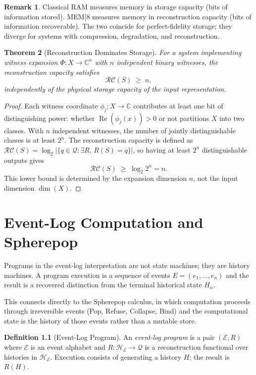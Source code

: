 \documentclass[12pt, oneside]{book}
\theoremstyle{plain}
\newtheorem{theorem}{Theorem}[chapter]
\theoremstyle{definition}
\newtheorem{definition}[theorem]{Definition}
\newtheorem{remark}[theorem]{Remark}
\theoremstyle{remark}
\newcommand{\calH}{\mathcal{H}}
\newcommand{\calQ}{\mathcal{Q}}
\newcommand{\CC}{\mathbb{C}}
\begin{document}
\begin{remark}
Classical RAM measures memory in storage capacity
(bits of information stored).
MEM|8 measures memory in reconstruction capacity
(bits of information recoverable).
The two coincide for perfect-fidelity storage;
they diverge for systems with compression, degradation,
and reconstruction.
\end{remark}

\begin{theorem}[Reconstruction Dominates Storage]
For a system implementing witness expansion $\Phi : X \to \CC^n$
with $n$ independent binary witnesses,
the reconstruction capacity satisfies
\[
  \mathcal{RC}(S) \;\geq\; n,
\]
independently of the physical storage capacity of the
input representation.
\end{theorem}

\begin{proof}
Each witness coordinate $\phi_j : X \to \CC$ contributes
at least one bit of distinguishing power: whether
$\operatorname{Re}(\phi_j(x)) > 0$ or not partitions $X$
into two classes.
With $n$ independent witnesses, the number of jointly
distinguishable classes is at least $2^n$.
The reconstruction capacity is defined as
$\mathcal{RC}(S) = \log_2 |\{q \in \calQ : \exists R,\, R(S) = q\}|$,
so having at least $2^n$ distinguishable outputs gives
\[
  \mathcal{RC}(S) \;\geq\; \log_2 2^n = n.
\]
This lower bound is determined by the expansion dimension
$n$, not the input dimension $\dim(X)$.
\end{proof}

\chapter{Event-Log Computation and Spherepop}

Programs in the event-log interpretation are not state
machines; they are history machines.
A program execution is a sequence of events
$E = (e_1, \ldots, e_n)$ and the result is a recovered
distinction from the terminal historical state $H_n$.

This connects directly to the Spherepop calculus,
in which computation proceeds through irreversible
events (Pop, Refuse, Collapse, Bind) and the
computational state is the history of those events
rather than a mutable store.

\begin{definition}[Event-Log Program]
An \emph{event-log program} is a pair $(\mathcal{E}, R)$
where $\mathcal{E}$ is an event alphabet and
$R : \calH_{\mathcal{E}} \to \calQ$ is a reconstruction
functional over histories in $\calH_{\mathcal{E}}$.
Execution consists of generating a history $H$;
the result is $R(H)$.
\end{definition}
\end{document}
